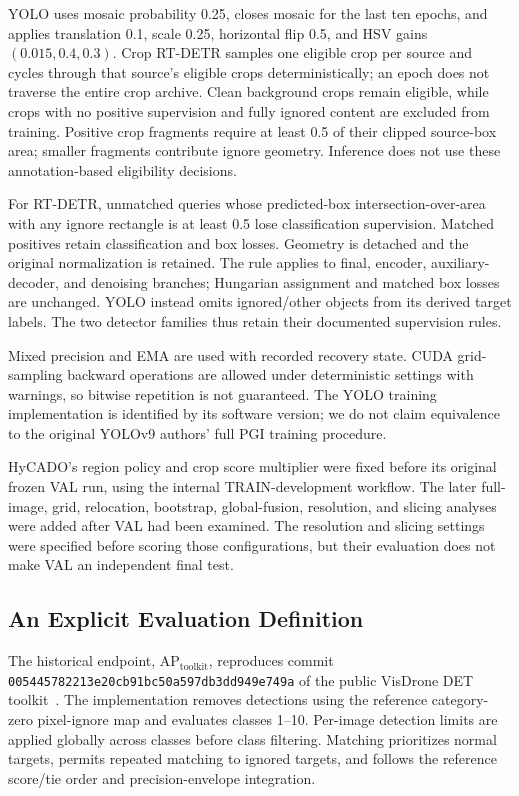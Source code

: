 \documentclass[journal]{IEEEtran}
\newcommand{\APlit}{\mathrm{AP}_{\mathrm{toolkit}}}
\begin{document}
YOLO uses mosaic probability 0.25, closes mosaic for the last ten epochs, and applies translation 0.1, scale 0.25, horizontal flip 0.5, and HSV gains $(0.015,0.4,0.3)$. Crop RT-DETR samples one eligible crop per source and cycles through that source's eligible crops deterministically; an epoch does not traverse the entire crop archive. Clean background crops remain eligible, while crops with no positive supervision and fully ignored content are excluded from training. Positive crop fragments require at least 0.5 of their clipped source-box area; smaller fragments contribute ignore geometry. Inference does not use these annotation-based eligibility decisions.

For RT-DETR, unmatched queries whose predicted-box intersection-over-area with any ignore rectangle is at least 0.5 lose classification supervision. Matched positives retain classification and box losses. Geometry is detached and the original normalization is retained. The rule applies to final, encoder, auxiliary-decoder, and denoising branches; Hungarian assignment and matched box losses are unchanged. YOLO instead omits ignored/other objects from its derived target labels. The two detector families thus retain their documented supervision rules.

Mixed precision and EMA are used with recorded recovery state. CUDA grid-sampling backward operations are allowed under deterministic settings with warnings, so bitwise repetition is not guaranteed. The YOLO training implementation is identified by its software version; we do not claim equivalence to the original YOLOv9 authors' full PGI training procedure.

HyCADO's region policy and crop score multiplier were fixed before its original frozen VAL run, using the internal TRAIN-development workflow. The later full-image, grid, relocation, bootstrap, global-fusion, resolution, and slicing analyses were added after VAL had been examined. The resolution and slicing settings were specified before scoring those configurations, but their evaluation does not make VAL an independent final test.

\subsection{An Explicit Evaluation Definition}
The historical endpoint, $\APlit$, reproduces commit \texttt{005445782213e20cb91bc50a597db3dd949e749a} of the public VisDrone DET toolkit~\cite{visdrone_toolkit}. The implementation removes detections using the reference category-zero pixel-ignore map and evaluates classes 1--10. Per-image detection limits are applied globally across classes before class filtering. Matching prioritizes normal targets, permits repeated matching to ignored targets, and follows the reference score/tie order and precision-envelope integration.
\end{document}
